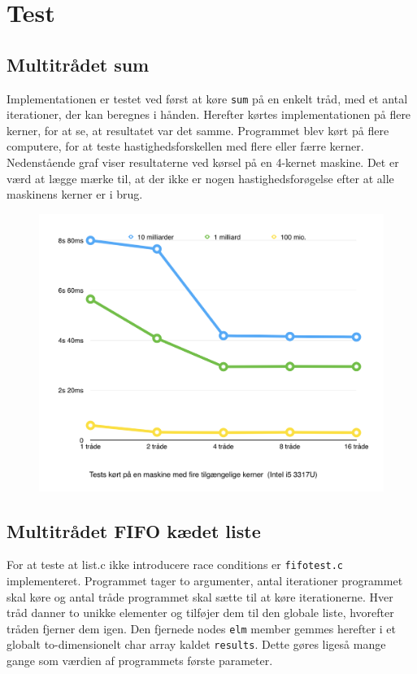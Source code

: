 \section{Test}

\subsection{Multitrådet sum}
Implementationen er testet ved først at køre \texttt{sum} på en enkelt tråd, med et antal iterationer, der kan beregnes i hånden.
Herefter kørtes implementationen på flere kerner, for at se, at resultatet var det samme. 
Programmet blev kørt på flere computere, for at teste hastighedsforskellen med flere eller færre kerner. 
Nedenstående graf viser resultaterne ved kørsel på en 4-kernet maskine. Det er værd at lægge mærke til, at der ikke er nogen hastighedsforøgelse efter at alle maskinens kerner er i brug. 

\begin{figure}[h!]
\center
\includegraphics[width=\linewidth]{../figures/graph.png}
\end{figure}

\subsection{Multitrådet FIFO kædet liste}
For at teste at list.c ikke introducere race conditions er \texttt{fifotest.c} implementeret. Programmet tager to argumenter, antal iterationer programmet skal køre og antal tråde programmet skal sætte til at køre iterationerne. Hver tråd danner to unikke elementer og tilføjer dem til den globale liste, hvorefter tråden fjerner dem igen. Den fjernede nodes \texttt{elm} member gemmes herefter i et globalt to-dimensionelt char array kaldet \texttt{results}. Dette gøres ligeså mange gange som værdien af programmets første parameter. \\

